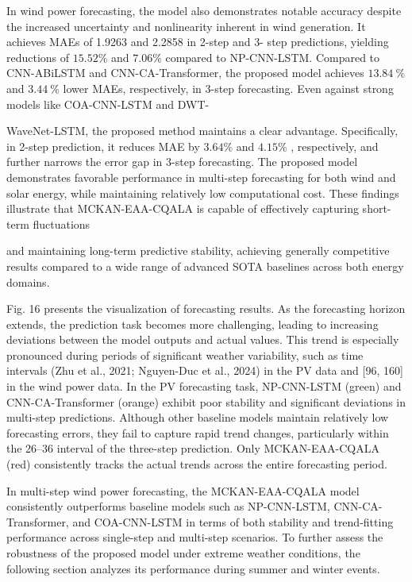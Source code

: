 \documentclass[
  10
]{article}
\begin{document}
In wind power forecasting, the model also demonstrates notable accuracy
despite the increased uncertainty and nonlinearity inherent in wind
generation. It achieves MAEs of 1.9263 and 2.2858 in 2-step and 3- step
predictions, yielding reductions of \(1 5 . 5 2 \%\) and \(7 . 0 6 \%\)
compared to NP-CNN-LSTM. Compared to CNN-ABiLSTM and CNN-CA-Transformer,
the proposed model achieves \(1 3 . 8 4 \ \%\) and \(3 . 4 4 \ \%\)
lower MAEs, respectively, in 3-step forecasting. Even against strong
models like COA-CNN-LSTM and DWT-

WaveNet-LSTM, the proposed method maintains a clear advantage.
Specifically, in 2-step prediction, it reduces MAE by \(3 . 6 4 \%\) and
\(4 . 1 5 \%\) , respectively, and further narrows the error gap in
3-step forecasting. The proposed model demonstrates favorable
performance in multi-step forecasting for both wind and solar energy,
while maintaining relatively low computational cost. These findings
illustrate that MCKAN-EAA-CQALA is capable of effectively capturing
short-term fluctuations

and maintaining long-term predictive stability, achieving generally
competitive results compared to a wide range of advanced SOTA baselines
across both energy domains.

Fig. 16 presents the visualization of forecasting results. As the
forecasting horizon extends, the prediction task becomes more
challenging, leading to increasing deviations between the model outputs
and actual values. This trend is especially pronounced during periods of
significant weather variability, such as time intervals (Zhu et al.,
2021; Nguyen-Duc et al., 2024) in the PV data and {[}96, 160{]} in the
wind power data. In the PV forecasting task, NP-CNN-LSTM (green) and
CNN-CA-Transformer (orange) exhibit poor stability and significant
deviations in multi-step predictions. Although other baseline models
maintain relatively low forecasting errors, they fail to capture rapid
trend changes, particularly within the 26--36 interval of the three-step
prediction. Only MCKAN-EAA-CQALA (red) consistently tracks the actual
trends across the entire forecasting period.

In multi-step wind power forecasting, the MCKAN-EAA-CQALA model
consistently outperforms baseline models such as NP-CNN-LSTM,
CNN-CA-Transformer, and COA-CNN-LSTM in terms of both stability and
trend-fitting performance across single-step and multi-step scenarios.
To further assess the robustness of the proposed model under extreme
weather conditions, the following section analyzes its performance
during summer and winter events.
\end{document}

